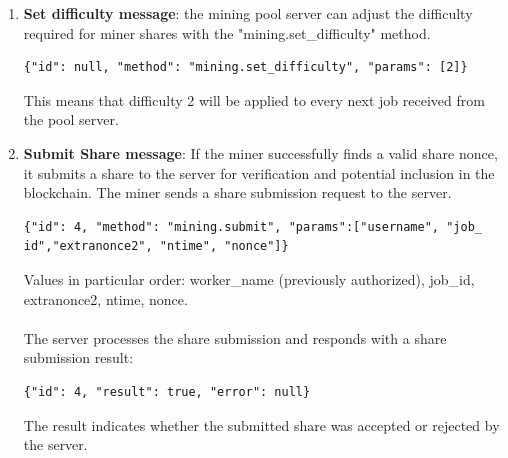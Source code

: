 \begin{enumerate}
    Details about how to build the coinbase transaction with data received from pool server, and how to assemble the block header to start mining on, will be explained in the next paragraph called "How to build Coinbase Transaction and Block Header".

    \item \textbf{Set difficulty message}: the mining pool server can adjust the difficulty required for miner shares with the "mining.set\_difficulty" method.
    \begin{verbatim}
{"id": null, "method": "mining.set_difficulty", "params": [2]}
    \end{verbatim}
    This means that difficulty 2 will be applied to every next job received from the pool server.

    \item \textbf{Submit Share message}: If the miner successfully finds a valid share nonce, it submits a share to the server for verification and potential inclusion in the blockchain. The miner sends a share submission request to the server.
    \begin{verbatim}
{"id": 4, "method": "mining.submit", "params":["username", "job_
id","extranonce2", "ntime", "nonce"]}
    \end{verbatim}
    Values in particular order: worker\_name (previously authorized), job\_id, extranonce2, ntime, nonce.\\\\
    The server processes the share submission and responds with a share submission result:
    \begin{verbatim}
{"id": 4, "result": true, "error": null}
    \end{verbatim}
    The result indicates whether the submitted share was accepted or rejected by the server.\\
\end{enumerate}

